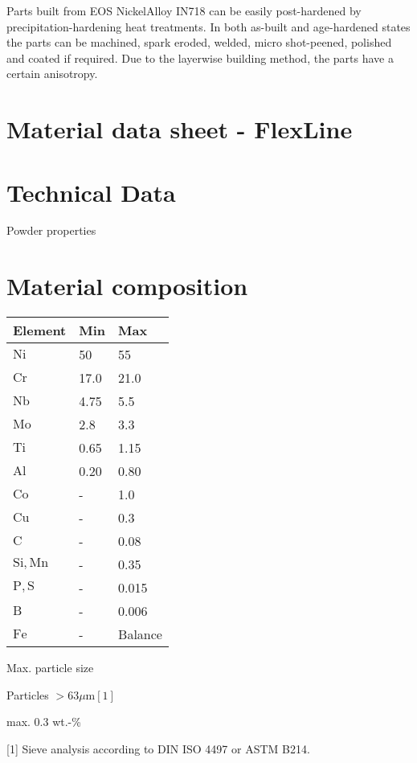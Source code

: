 \documentclass[10pt]{article}
\begin{document}
Parts built from EOS NickelAlloy IN718 can be easily post-hardened by precipitation-hardening heat treatments. In both as-built and age-hardened states the parts can be machined, spark eroded, welded, micro shot-peened, polished and coated if required. Due to the layerwise building method, the parts have a certain anisotropy.

\section*{Material data sheet - FlexLine}
\section*{Technical Data}
Powder properties

\section*{Material composition}
\begin{center}
\begin{tabular}{lll}
Element & Min & Max \\
\hline
$\mathrm{Ni}$ & 50 & 55 \\
\hline
$\mathrm{Cr}$ & 17.0 & 21.0 \\
\hline
$\mathrm{Nb}$ & 4.75 & 5.5 \\
\hline
$\mathrm{Mo}$ & 2.8 & 3.3 \\
\hline
$\mathrm{Ti}$ & 0.65 & 1.15 \\
\hline
$\mathrm{Al}$ & 0.20 & 0.80 \\
\hline
$\mathrm{Co}$ & - & 1.0 \\
\hline
$\mathrm{Cu}$ & - & 0.3 \\
\hline
$\mathrm{C}$ & - & 0.08 \\
\hline
$\mathrm{Si}, \mathrm{Mn}$ & - & 0.35 \\
\hline
$\mathrm{P}, \mathrm{S}$ & - & 0.015 \\
\hline
$\mathrm{B}$ & - & 0.006 \\
\hline
$\mathrm{Fe}$ & - & Balance \\
\hline
\end{tabular}
\end{center}

Max. particle size

Particles $>63 \mu \mathrm{m}[1]$

max. 0.3 wt.-\%

[1] Sieve analysis according to DIN ISO 4497 or ASTM B214.
\end{document}
